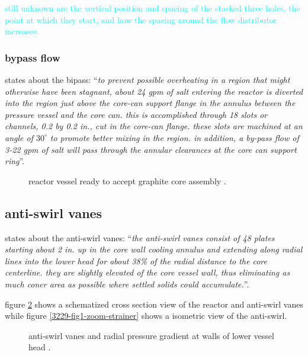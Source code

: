 \documentclass{article}
\begin{document}
\begin{preview}
\textcolor{cyan}{still unknown are the vertical position and spacing of the stacked three holes, the point at which they start, and how the spacing around the flow distributor increases.}

\subsubsection{bypass flow}
\parencite[page 85]{ornl-tm-0728} states about the bipass:
\enquote{\textit{to prevent possible overheating in a region that might otherwise have been stagnant, about 24 gpm of salt entering the reactor is diverted into the region just above the core-can support flange in the annulus between the pressure vessel and the core can. this is accomplished through 18 slots or channels, 0.2 by 0.2 in., cut in the core-can flange. these slots are machined at an angle of $30^\circ$ to promote better mixing in the region. in addition, a by-pass flow of 3-22 gpm of salt will pass through the annular clearances at the core can support ring}}.

\begin{figure}[H]
  \centering
  \caption{reactor vessel ready to accept graphite core assembly \parencite[figure 39]{ornl-3708}.}
  \label{3708-fig39}
\end{figure}

\subsection{anti-swirl vanes}
\textcite[page 14]{ornl-tm-3229} states about the anti-swirl vanes: \enquote{\textit{the anti-swirl vanes consist of 48 plates starting about 2 in. up in the core wall cooling annulus and extending along radial lines into the lower head for about 38\% of the radial distance to the core centerline. they are slightly elevated of the core vessel wall, thus eliminating as much coner area as possible where settled solids could accumulate.}}.

figure \ref{3229-fig9} shows a schematized cross section view of the reactor and anti-swirl vanes while figure \ref{3229-fig1-zoom-strainer} shows a isometric view of the anti-swirl.

\begin{figure}[H]
  \centering
  \caption{anti-swirl vanes and radial pressure gradient at walls of lower vessel head \parencite[figure 9]{ornl-tm-3229}.}
  \label{3229-fig9}
\end{figure}


\end{preview}
\end{document}

